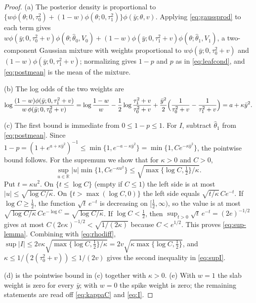 \documentclass[11pt]{article}
\theoremstyle{definition}
\theoremstyle{plain}
\begin{document}
{\begin{proof}
(a) The posterior density is proportional to $\{w\phi(\theta;0,\tau_0^2)+(1-w)\phi(\theta;0,\tau_1^2)\}\phi(\bar y;\theta,v)$. Applying \eqref{eq:gaussprod} to each term gives $w\phi(\bar y;0,\tau_0^2+v)\phi(\theta;\hat\theta_0,V_0)+(1-w)\phi(\bar y;0,\tau_1^2+v)\phi(\theta;\hat\theta_1,V_1)$, a two-component Gaussian mixture with weights proportional to $w\phi(\bar y;0,\tau_0^2+v)$ and $(1-w)\phi(\bar y;0,\tau_1^2+v)$; normalizing gives $1-p$ and $p$ as in \eqref{eq:leafcond}, and \eqref{eq:postmean} is the mean of the mixture.

(b) The log odds of the two weights are
\[
\log\frac{(1-w)\phi(\bar y;0,\tau_1^2+v)}{w\,\phi(\bar y;0,\tau_0^2+v)}
=\log\frac{1-w}{w}-\frac{1}{2}\log\frac{\tau_1^2+v}{\tau_0^2+v}+\frac{\bar y^2}{2}\Bigl(\frac{1}{\tau_0^2+v}-\frac{1}{\tau_1^2+v}\Bigr)=a+\kappa\bar y^2 .
\]

(c) The first bound is immediate from $0\le1-p\le1$. For $I$, subtract $\hat\theta_1$ from \eqref{eq:postmean}. Since $1-p=(1+e^{a+\kappa\bar y^2})^{-1}\le\min\{1,e^{-a-\kappa\bar y^2}\}=\min\{1,Ce^{-\kappa\bar y^2}\}$, the pointwise bound follows. For the supremum we show that for $\kappa>0$ and $C>0$,
\begin{equation}
\sup_{u\in\mathbb R}|u|\min\{1,Ce^{-\kappa u^2}\}\le\sqrt{\max\{\log C,\tfrac12\}/\kappa}.
\label{eq:sup-lemma}
\end{equation}
Put $t=\kappa u^2$. On $\{t\le\log C\}$ (empty if $C\le1$) the left side is at most $|u|\le\sqrt{\log C/\kappa}$. On $\{t>\max(\log C,0)\}$ the left side equals $\sqrt{t/\kappa}\,Ce^{-t}$. If $\log C\ge\tfrac12$, the function $\sqrt t\,e^{-t}$ is decreasing on $[\tfrac12,\infty)$, so the value is at most $\sqrt{\log C/\kappa}\,Ce^{-\log C}=\sqrt{\log C/\kappa}$. If $\log C<\tfrac12$, then $\sup_{t>0}\sqrt t\,e^{-t}=(2e)^{-1/2}$ gives at most $C(2e\kappa)^{-1/2}<\sqrt{1/(2\kappa)}$ because $C<e^{1/2}$. This proves \eqref{eq:sup-lemma}. Combining with \eqref{eq:rhodiff}, $\sup|I|\le2v\kappa\sqrt{\max\{\log C,\tfrac12\}/\kappa}=2v\sqrt{\kappa\max\{\log C,\tfrac12\}}$, and $\kappa\le1/(2(\tau_0^2+v))\le1/(2v)$ gives the second inequality in \eqref{eq:supI}.

(d) is the pointwise bound in (c) together with $\kappa>0$. (e) With $w=1$ the slab weight is zero for every $\bar y$; with $w=0$ the spike weight is zero; the remaining statements are read off \eqref{eq:kappaC} and \eqref{eq:I}.
\end{proof}

}
\end{document}
